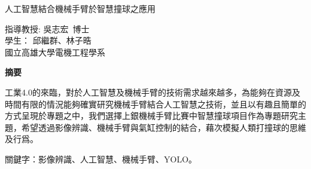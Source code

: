 {} %
    \fontsize{12}{18pt}\selectfont

    \begin{center}
        \LARGE 人工智慧結合機械手臂於智慧撞球之應用 \\
    \end{center}

    \vspace*{0.25cm}

    {\small
        \begin{center}
        指導教授: 吳志宏\ 博士 \\
        學生： 邱繼群、林子晧\  \\
        國立高雄大學電機工程學系
        \end{center}
    }

    \vspace*{0.25cm}

    \begin{center}
        {\large \bf 摘要}\\[12pt]
    \end{center}
    \hspace{7mm}
	工業4.0的來臨，對於人工智慧及機械手臂的技術需求越來越多，為能夠在資源及
	時間有限的情況能夠確實研究機械手臂結合人工智慧之技術，並且以有趣且簡單的
	方式呈現於專題之中，我們選擇上銀機械手臂比賽中智慧撞球項目作為專題研究主
	題，希望透過影像辨識、機械手臂與氣缸控制的結合，藉次模擬人類打撞球的思維
	及行爲。
    \vspace{5mm}

    \noindent
    關鍵字：影像辨識、人工智慧、機械手臂、YOLO。

